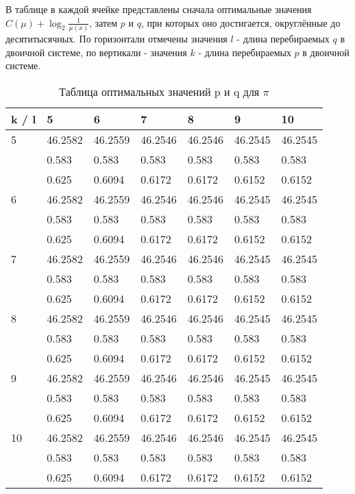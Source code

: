 \documentclass[12pt]{article}
\begin{document}
	
	В таблице в каждой ячейке представлены сначала оптимальные значения $C(\mu)+\log_2{\frac{1}{\mu(x)}}$, затем $p$ и $q$, при которых оно достигается, округлённые до десятитысячных. По горизонтали отмечены значения $l$ - длина перебираемых $q$  в двоичной системе, по вертикали - значения $k$ - длина перебираемых $p$  в двоичной системе.
	
	\begin{table}[h]
		\caption{Таблица оптимальных значений p и q для $\pi$}
		\label{pitable}
		\begin{center}
		\begin{tabular}{|l|l|l|l|l|l|l|}
			\hline
			k / l &5 & 6 & 7 & 8 & 9 & 10\\
			\hline
			5 & 46.2582& 46.2559& 46.2546& 46.2546& 46.2545& 46.2545\\
			& 0.583& 0.583& 0.583& 0.583& 0.583& 0.583\\
			& 0.625& 0.6094& 0.6172& 0.6172& 0.6152& 0.6152\\
			
			\hline
			6 & 46.2582& 46.2559& 46.2546& 46.2546& 46.2545& 46.2545\\
			& 0.583& 0.583& 0.583& 0.583& 0.583& 0.583\\
			& 0.625& 0.6094& 0.6172& 0.6172& 0.6152& 0.6152\\
			\hline
			7 & 46.2582& 46.2559& 46.2546& 46.2546& 46.2545& 46.2545\\
			& 0.583& 0.583& 0.583& 0.583& 0.583& 0.583\\
			& 0.625& 0.6094& 0.6172& 0.6172& 0.6152& 0.6152\\
			\hline
			8 & 46.2582& 46.2559& 46.2546& 46.2546& 46.2545& 46.2545\\
			& 0.583& 0.583& 0.583& 0.583& 0.583& 0.583\\
			& 0.625& 0.6094& 0.6172& 0.6172& 0.6152& 0.6152\\
			\hline
			9 & 46.2582& 46.2559& 46.2546& 46.2546& 46.2545& 46.2545\\
			& 0.583& 0.583& 0.583& 0.583& 0.583& 0.583\\
			& 0.625& 0.6094& 0.6172& 0.6172& 0.6152& 0.6152\\
			\hline
			10 & 46.2582& 46.2559& 46.2546& 46.2546& 46.2545& 46.2545\\
			& 0.583& 0.583& 0.583& 0.583& 0.583& 0.583\\
			& 0.625& 0.6094& 0.6172& 0.6172& 0.6152& 0.6152\\
			\hline
		\end{tabular}
		\end{center}
	\end{table}
	
	
\end{document}

